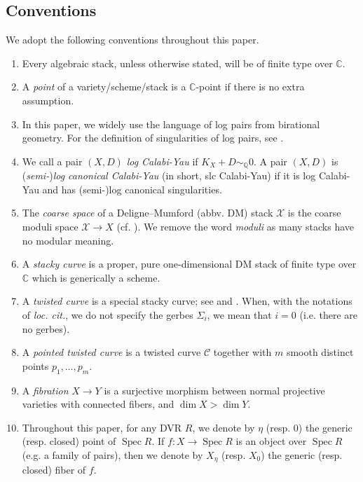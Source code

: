 \documentclass[a4paper,12pt]{amsart}
\newcommand{\marg}[1]{\normalsize{{\color{red}\footnote{{\color{blue}#1}}}{\marginpar[{\color{blue}\hfill\tiny\thefootnote$\rightarrow$}]{{\color{purple}$\leftarrow$\tiny\thefootnote}}}}}
\DeclareMathOperator{\Spec}{Spec}
\newcommand{\bC}{{\mathbb C}}
\newcommand{\bQ}{{\mathbb Q}}
\newcommand{\sC}{{\mathscr{C}}}
\newcommand{\Gio}[1]{\marg{(Giovanni) #1}}
\theoremstyle{definition}
\theoremstyle{remark}
\begin{document}
\begin{center}
\begin{longtable}{| p{} | p{} |}
\end{longtable}
    
\end{center}


\subsection*{Conventions} We adopt the following conventions throughout this paper.
\begin{enumerate}
    \item Every algebraic stack, unless otherwise stated, will be of finite type over $\bC$.
    \item A \emph{point} of a variety/scheme/stack is a $\bC$-point if there is no extra assumption. 
    \item In this paper, we widely use the language of log pairs from birational geometry. For the definition of singularities of log pairs, see \cite{KM98,Kol13}.
    \item We call a pair $(X,D)$ \emph{log Calabi-Yau} if $K_X+D\sim_{\bQ}0$. A pair $(X,D)$ is (\emph{semi-})\emph{log canonical Calabi-Yau} (in short, slc Calabi-Yau) if it is log Calabi-Yau and has (semi-)log canonical singularities.
    \item The \emph{coarse space} of a Deligne--Mumford (abbv. DM) stack $\mathcal{X}$ is the coarse moduli space $\mathcal{X}\rightarrow X$ (cf. \cite[Tag 04UX]{Sta18}). We remove the word \emph{moduli} as many stacks have no modular meaning.
    \item A \emph{stacky curve} is a proper, pure one-dimensional DM stack of finite type over $\bC$ which is generically a scheme.
    \item A \emph{twisted curve} is a special stacky curve; see \cite[Definition 4.1.2]{AV02} and \cite[Definition 1.2]{olsson2007log}. When, with the notations of \textit{loc. cit.}, we do not specify the gerbes $\Sigma_i$, we mean that $i=0$ (i.e. there are no gerbes). 
    \item A \textit{pointed twisted curve} is a twisted curve $\sC$ together with $m$ smooth distinct points $p_1,\ldots,p_m$.
    \item A \emph{fibration} $X\rightarrow Y$ is a surjective morphism between normal projective varieties with connected fibers, and $\dim X>\dim Y$.
    \item Throughout this paper, for any DVR $R$, we denote by $\eta$ (resp. $0$) the generic (resp. closed) point of $\Spec R$. If $f:X\rightarrow \Spec R$ is an object over $\Spec R$ (e.g. a family of pairs), then we denote by $X_\eta$ (resp. $X_{0}$) the generic (resp. closed) fiber of $f$.%
\end{enumerate} 
\end{document}
